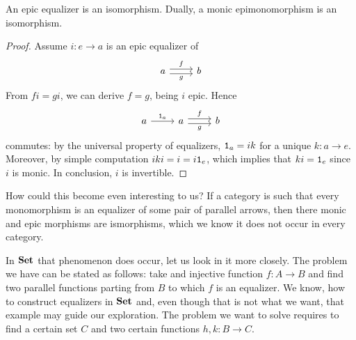 \begin{proposition}
An epic equalizer is an isomorphism. Dually, a monic epimonomorphism is an isomorphism.
\end{proposition}

\begin{proof}
Assume \(i : e \to a\) is an epic equalizer of
\[\begin{tikzcd} a \ar["f", r, shift left] \ar["g", r, shift right, swap] & b \end{tikzcd}\] From \(fi = gi\), we can derive \(f = g\), being \(i\) epic. Hence
\[\begin{tikzcd} a \ar["{\id_a}", r] & a \ar["f", r, shift left] \ar["g", r, shift right, swap] & b \end{tikzcd}\]
commutes: by the universal property of equalizers, \(\mathtt 1_a = ik\) for a unique \(k : a \to e\). Moreover, by simple computation \(iki = i = i \mathtt 1_e\), which implies that \(ki = \mathtt 1_e\) since \(i\) is monic. In conclusion, \(i\) is invertible.
\end{proof}

How could this become even interesting to us? If a category is such that every monomorphism is an equalizer of some pair of parallel arrows, then there monic and epic morphisms are ismorphisms, which we know it does not occur in every category.

\begin{example}
In \(\mathbf{Set}\) that phenomenon does occur, let us look in it more closely. The problem we have can be stated as follows: take and injective function \(f : A \to B\) and find two parallel functions parting from \(B\) to which \(f\) is an equalizer. We know, how to construct equalizers in \(\mathbf{Set}\) and, even though that is not what we want, that example may guide our exploration. The problem we want to solve requires to find a certain set \(C\) and two certain functions \(h, k : B \to C\). \YetToBeTeXed{}
\end{example}

